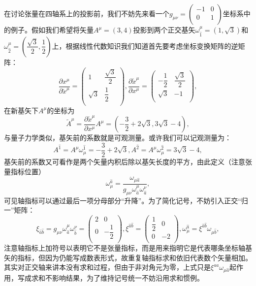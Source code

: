 \documentclass[11pt, a4paper, oneside, onecolumn]{ctexart}
\numberwithin{equation}{subsection}
\begin{document}
在讨论张量在四轴系上的投影前，我们不妨先来看一个$g_{\mu\nu}=\begin{pmatrix}
-1 & 0\\
0 & 1\\
\end{pmatrix}$坐标系中的例子。假如我们希望将矢量$A^{\mu}=\left(3,4\right)$投影到两个正交基矢$\omega^{\mu}_{\hat{1}}=\left(1,\sqrt{3}\right)$和$\omega^{\mu}_{\hat{2}}=\left(\dfrac{\sqrt{3}}{2},\dfrac{1}{2}\right)$上，根据线性代数知识我们知道首先要考虑坐标变换矩阵的逆矩阵：
\begin{equation}
\frac{\partial{}x^{\mu}}{\partial{}\widetilde{x}^{\mu}}=\begin{pmatrix}
1 & \dfrac{\sqrt{3}}{2}\\
\sqrt{3} & \dfrac{1}{2}\\
\end{pmatrix},\frac{\partial{}\widetilde{x}^{\mu}}{\partial{}x^{\mu}}=\begin{pmatrix}
-\dfrac{1}{2} & \dfrac{\sqrt{3}}{2}\\
\sqrt{3} & -1\\
\end{pmatrix},
\end{equation}
在新基矢下$A^{\mu}$的坐标为
\begin{equation}
\widetilde{A}^{\mu}=\frac{\partial{}\widetilde{x}^{\mu}}{\partial{}x^{\mu}}A^{\mu}=\left(-\frac{3}{2}+2\sqrt{3},3\sqrt{3}-4\right),
\end{equation}
与量子力学类似，基矢前的系数就是可观测量。或许我们可以记观测量为：
\begin{equation}
A^{\hat{1}}=A^{\mu}\omega_{\mu}^{\hat{1}}=-\frac{3}{2}+2\sqrt{3},A^{\hat{2}}=A^{\mu}\omega_{\mu}^{\hat{2}}=3\sqrt{3}-4,
\end{equation}
基矢前的系数又可看作是两个矢量内积后除以基矢长度的平方，由此定义（注意张量指标位置）
\begin{equation}
\omega_{\mu}^{\hat{a}}=\frac{\omega_{\mu\hat{a}}}{g_{\mu\nu}\omega^{\mu}_{\hat{a}}\omega^{\nu}_{\hat{a}}},
\end{equation}
可见轴指标可以通过最后一项分母部分“升降”。为了简化记号，不妨引入正交“归一”矩阵：
\begin{equation}
\xi_{\hat{a}\hat{b}}=g_{\mu\nu}\omega^{\mu}_{\hat{a}}\omega^{\nu}_{\hat{b}}=\begin{pmatrix}
2 & 0\\
0 & -\dfrac{1}{2}\\
\end{pmatrix},\xi^{\hat{a}\hat{b}}=\begin{pmatrix}
\dfrac{1}{2} & 0\\
0 & -2\\
\end{pmatrix},
\omega^{\hat{a}}_{\mu}=\xi^{\hat{a}\hat{b}}\omega_{\mu\hat{b}},
\end{equation}
注意轴指标上加符号$\hat{}$以表明它不是张量指标，而是用来指明它是代表哪条坐标轴基矢的指标，但因为仍能写成数表形式，故重复轴指标求和依旧代表数个矢量相加。其实对正交轴来讲本没有求和过程，但由于非对角元为零，上式只是$\xi^{aa}\omega_{\mu\hat{a}}$起作用，写成求和不影响结果，为了维持记号统一不妨沿用求和惯例。
\end{document}
